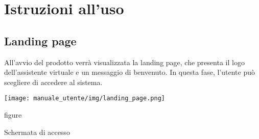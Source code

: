 \section{Istruzioni all'uso}

\subsection{Landing page}
All'avvio del prodotto verrà visualizzata la landing page, che presenta il logo dell'assistente virtuale e un messaggio di benvenuto. In questa fase, l'utente può scegliere di accedere al sistema.
\begin{center}
    \texttt{[image: manuale\_utente/img/landing\_page.png]}
    \caption{figure}{Schermata di accesso}
\end{center}